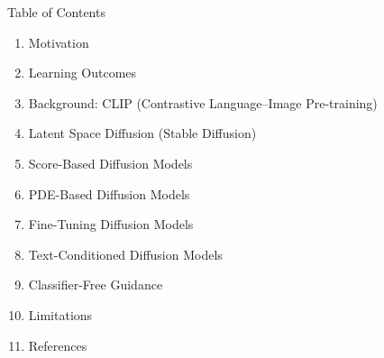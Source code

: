 \begin{frame}[allowframebreaks]{Table of Contents}
\begin{enumerate}
    \item Motivation
    \item Learning Outcomes
    \item Background: CLIP (Contrastive Language--Image Pre-training)
    \item Latent Space Diffusion (Stable Diffusion)
    \item Score-Based Diffusion Models
    \item PDE-Based Diffusion Models
    \item Fine-Tuning Diffusion Models
    \item Text-Conditioned Diffusion Models
    \item Classifier-Free Guidance
    \item Limitations
    \item References
\end{enumerate}
\end{frame}